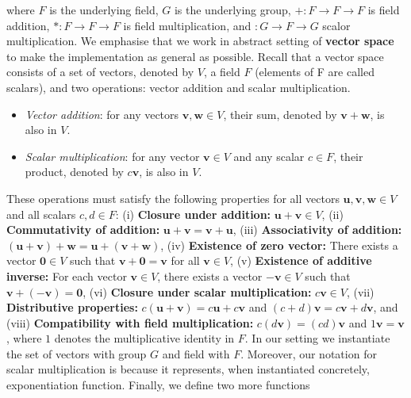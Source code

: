 \documentclass[conference,compsoc]{IEEEtran}
\begin{document}
 where $F$ is the underlying field, $G$ is the underlying group,
 $+ : F \rightarrow F \rightarrow F$ is field addition,
 $* : F \rightarrow F \rightarrow F$ is field multiplication, and
 $: G \rightarrow F \rightarrow G$ scalor multiplication. 
 We emphasise that we work in abstract setting of \textbf{vector space} to 
 make the implementation as general as possible. Recall that a vector space consists of a set of 
 vectors, denoted by \(V\), a field \(F\) (elements of F are called scalars), and 
 two operations: vector addition and scalar multiplication.

\begin{itemize}
    \item \textit{Vector addition}: for any vectors \(\mathbf{v}, \mathbf{w} \in V\), their sum, denoted by \(\mathbf{v} + \mathbf{w}\), is also in \(V\).
    \item \textit{Scalar multiplication}: for any vector \(\mathbf{v} \in V\) and any scalar \(c \in F\), their product, denoted by \(c\mathbf{v}\), is also in \(V\).
\end{itemize}

These operations must satisfy the following properties for all vectors \(\mathbf{u}, \mathbf{v}, \mathbf{w} \in V\) and all scalars \(c, d \in F\):
(i) \textbf{Closure under addition:} \(\mathbf{u} + \mathbf{v} \in V\), (ii) \textbf{Commutativity of addition:} \(\mathbf{u} + \mathbf{v} = \mathbf{v} + \mathbf{u}\), 
(iii)  \textbf{Associativity of addition:} \((\mathbf{u} + \mathbf{v}) + \mathbf{w} = \mathbf{u} + (\mathbf{v} + \mathbf{w})\), 
(iv) \textbf{Existence of zero vector:} There exists a vector \(\mathbf{0} \in V\) such that \(\mathbf{v} + \mathbf{0} = \mathbf{v}\) for all \(\mathbf{v} \in V\), 
(v) \textbf{Existence of additive inverse:} For each vector \(\mathbf{v} \in V\), there exists a vector \(-\mathbf{v} \in V\) such that \(\mathbf{v} + (-\mathbf{v}) = \mathbf{0}\),
(vi) \textbf{Closure under scalar multiplication:} \(c\mathbf{v} \in V\), 
(vii) \textbf{Distributive properties:} \(c(\mathbf{u} + \mathbf{v}) = c\mathbf{u} + c\mathbf{v}\) and \((c + d)\mathbf{v} = c\mathbf{v} + d\mathbf{v}\), 
and (viii) \textbf{Compatibility with field multiplication:} \(c(d\mathbf{v}) = (cd)\mathbf{v}\) and \(1\mathbf{v} = \mathbf{v}\), where \(1\) denotes the multiplicative identity in \(F\).
In our setting we instantiate the set of vectors with group $G$ and field with $F$. Moreover, our notation for scalar multiplication 
is because it represents, when instantiated concretely, exponentiation function. Finally, 
we define two more functions 
\end{document}
